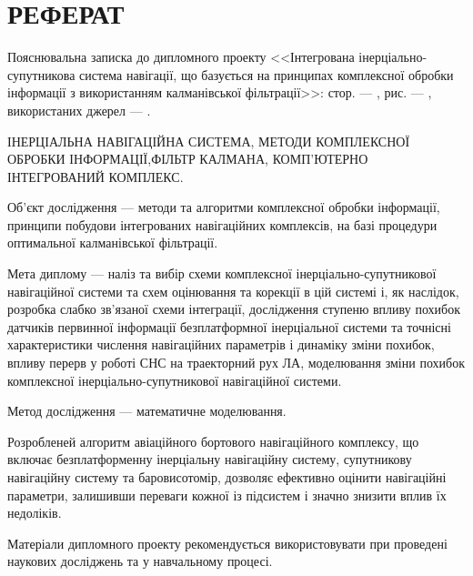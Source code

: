 % 
% 

\section*{РЕФЕРАТ}
Пояснювальна записка до дипломного проекту <<Інтегрована інерціально-супутникова система навігації, що базується на принципах комплексної обробки інформації
з використанням калманівської фільтрації>>: стор. ---   , рис. --- , використаних джерел --- .



ІНЕРЦІАЛЬНА НАВІГАЦІЙНА СИСТЕМА, МЕТОДИ КОМПЛЕКСНОЇ ОБРОБКИ ІНФОРМАЦІЇ,ФІЛЬТР КАЛМАНА, КОМП’ЮТЕРНО ІНТЕГРОВАНИЙ КОМПЛЕКС.

Об’єкт дослідження --- методи та алгоритми комплексної обробки інформації, принципи побудови інтегрованих навігаційних комплексів, на базі процедури
оптимальної калманівської фільтрації.

Мета диплому --- наліз та вибір схеми комплексної інерціально-супутникової 
навігаційної системи та схем оцінювання та корекції в цій системі і, як наслідок, 
розробка слабко зв’язаної схеми інтеграції, дослідження ступеню 
впливу похибок датчиків первинної інформації  безплатформної інерціальної системи 
та точнісні характеристики числення навігаційних параметрів і динаміку зміни похибок, 
впливу перерв у роботі СНС на траекторний рух ЛА, моделювання зміни похибок 
комплексної інерціально-супутникової навігаційної системи.

Метод дослідження --- математичне моделювання.

Розробленей алгоритм авіаційного бортового навігаційного комплексу, що включає безплатформенну інерціальну навігаційну
систему, супутникову навігаційну систему та баровисотомір, дозволяє ефективно оцінити навігаційні параметри, залишивши
переваги кожної із підсистем і значно знизити вплив їх недоліків.

Матеріали дипломного проекту рекомендується використовувати при проведені наукових досліджень та у навчальному процесі.

%
